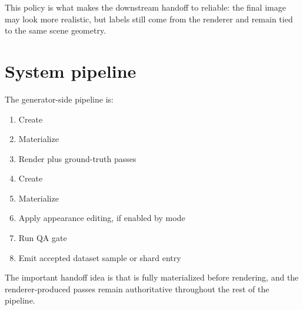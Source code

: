 This policy is what makes the downstream handoff to \yolozu{} reliable: the final image may look more realistic, but labels still come from the renderer and remain tied to the same scene geometry.

\section{System pipeline}

The generator-side pipeline is:
\begin{enumerate}
  \item Create 
  \item Materialize 
  \item Render  plus ground-truth passes
  \item Create 
  \item Materialize 
  \item Apply appearance editing, if enabled by mode
  \item Run QA gate
  \item Emit accepted dataset sample or shard entry
\end{enumerate}

The important handoff idea is that  is fully materialized before rendering, and the renderer-produced passes remain authoritative throughout the rest of the pipeline.

